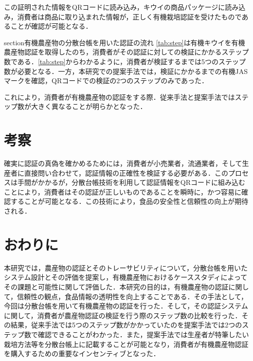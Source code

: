 \documentclass[twocolumn]{jarticle} %
\begin{document}
この証明された情報をQRコードに読み込み，キウイの商品パッケージに読み込み，消費者は商品に取り込まれた情報が，正しく有機栽培認証を受けたものであることが確認が可能となる．

section{有機農産物の分散台帳を用いた認証の流れ}
\ref{tab:step}は有機キウイを有機農産物認証を取得したのち，消費者がその認証に対しての検証にかかるステップ数である．\ref{tab:step}からわかるように，消費者が検証するまでは5つのステップ数が必要となる．一方，本研究での提案手法では，検証にかかるまでの有機JASマークを確認，QRコードでの検証の2つのステップのみであった．

これにより，消費者が有機農産物の認証をする際．従来手法と提案手法ではステップ数が大きく異なることが明らかとなった．

\section{考察}

確実に認証の真偽を確かめるためには，消費者が小売業者，流通業者，そして生産者に直接問い合わせて，認証情報の正確性を検証する必要がある．このプロセスは手間がかかるが，分散台帳技術を利用して認証情報をQRコードに組み込むことにより，消費者はその認証が正しいものであることを瞬時に，かつ容易に確認することが可能となる．この技術により，食品の安全性と信頼性の向上が期待される．

\section{おわりに}

本研究では，農産物の認証とそのトレーサビリティについて，分散台帳を用いたシステム設計とその評価を提案し，有機農産物におけるケーススタディによってその課題と可能性に関して評価した．本研究の目的は，有機農産物の認証に関して，信頼性の観点，食品情報の透明性を向上することである．その手法として，今回は分散台帳を用いて有機農産物の認証を行った．そして，その認証システムに関して，消費者が農産物認証の検証を行う際のステップ数の比較を行った．その結果，従来手法では5つのステップ数がかかっていたのを提案手法では2つのステップ数で確認できることがわかった．また，提案手法では生産者が特筆したい栽培方法等を分散台帳上に記載することが可能となり，消費者が有機農産物認証を購入するための重要なインセンティブとなった．







\end{document}
